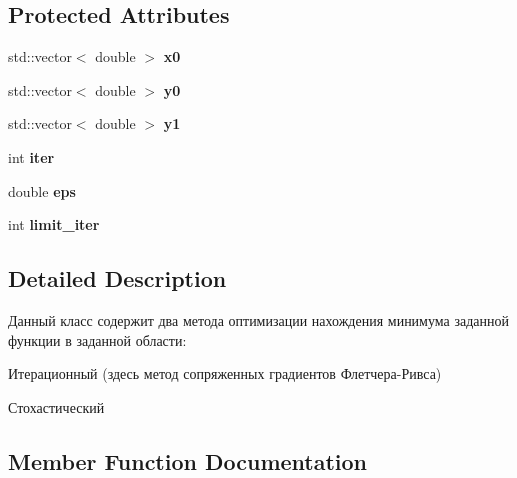 \subsection*{Protected Attributes}
\begin{DoxyCompactItemize}
\item 
\mbox{\label{class_optimization_method_acaad093b3b09087b6a4f01213b887a6e}} 
std\+::vector$<$ double $>$ {\bfseries x0}
\item 
\mbox{\label{class_optimization_method_a8c49149ae44f8f39e3c120221a1f3a97}} 
std\+::vector$<$ double $>$ {\bfseries y0}
\item 
\mbox{\label{class_optimization_method_a9ccddf8151dad78644c061023cde519b}} 
std\+::vector$<$ double $>$ {\bfseries y1}
\item 
\mbox{\label{class_optimization_method_aa4ae38435665f3a28b9c661e69f539b2}} 
int {\bfseries iter}
\item 
\mbox{\label{class_optimization_method_af2113a4e55f9ff2f7cd65469f3fc1a55}} 
double {\bfseries eps}
\item 
\mbox{\label{class_optimization_method_a724a0ba7ab2a661bc495680fc15006e0}} 
int {\bfseries limit\+\_\+iter}
\end{DoxyCompactItemize}


\subsection{Detailed Description}
Данный класс содержит два метода оптимизации нахождения минимума заданной функции в заданной области\+:
\begin{DoxyItemize}
\item Итерационный (здесь метод сопряженных градиентов Флетчера-\/Ривса)
\item Стохастический 
\end{DoxyItemize}

\subsection{Member Function Documentation}
\mbox{\label{class_optimization_method_a63dd17c00593363a017c8dd440770aa2}} 
